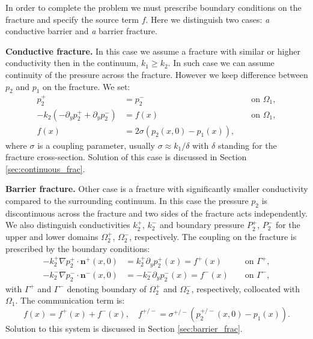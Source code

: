 \documentclass[a4paper,10pt]{article}
\def\prtl{\partial} %
\def\grad{\nabla}
\def\vc#1{\mathbf{\boldsymbol{#1}}}     %
\begin{document}
In order to complete the problem we must prescribe boundary conditions on the fracture and specify the source term $f$. Here we 
distinguish two cases: {\emph a conductive barrier} and {\emph a barrier fracture}.


{\bf Conductive fracture.} In this case we assume a fracture with similar or higher conductivity then in the continuum, $k_1 \ge k_2$.
In such case we can assume continuity of the pressure across the fracture. However we keep difference between $p_2$ and $p_1$ on the fracture.
We set:
\begin{align}
  \label{eq:c_coupling_a}
  p_2^+ &= p_2^-                &&\text{ on }\Omega_1,\\
  -k_2 (-\prtl_y p_2^+ + \prtl_y p_2^-) &= f(x)         &&\text{ on }\Omega_1,\\
  f(x) &= 2\sigma (p_2(x,0) - p_1(x)),   &&
  \label{eq:c_coupling_c}
\end{align}
where $\sigma$ is a coupling parameter, usually $\sigma \approx k_1 / \delta$ with $\delta$ standing for the fracture cross-section. 
Solution of this case is discussed in Section \ref{sec:continuous_frac}.



{\bf Barrier fracture.} Other case is a fracture with significantly smaller conductivity compared to the surrounding continuum. In this case
the pressure $p_2$ is discontinuous across the fracture and two sides of the fracture acts independently. We also 
distinguish conductivities $k_2^+$, $k_2^-$ and boundary pressure $P_2^+$, $P_2^-$ for the upper and lower domains $\Omega_2^+$, $\Omega_2^-$, 
respectively. The coupling on the fracture is prescribed by the boundary conditions:
\begin{align}
  \label{eq:bc_barrier_p}  
  - k_2^+ \grad p_2^+\cdot \vc n^+(x,0) &= k_2^+ \prtl_y p_2^+(x) = f^+(x) 
                    &&\text{ on }\Gamma^{+},\\
  \label{eq:bc_barrier_m}
  - k_2^- \grad p_2^-\cdot \vc n^-(x,0) &= -k_2^- \prtl_y p_2^-(x) = f^-(x) 
                    &&\text{ on }\Gamma^{-},
\end{align}
with $\Gamma^{+}$ and $\Gamma^{-}$ denoting boundary of $\Omega_2^+$ and $\Omega_2^-$, respectively, collocated with $\Omega_1$.
The communication term is:
\begin{equation}
  \label{eq:coupling_barrier}
  f(x) = f^+(x) + f^-(x),\quad f^{+/-} = \sigma^{+/-} (p^{+/-}_2(x,0) - p_1(x)).
\end{equation}
Solution to this system is discussed in Section \ref{sec:barrier_frac}. 
\end{document}
